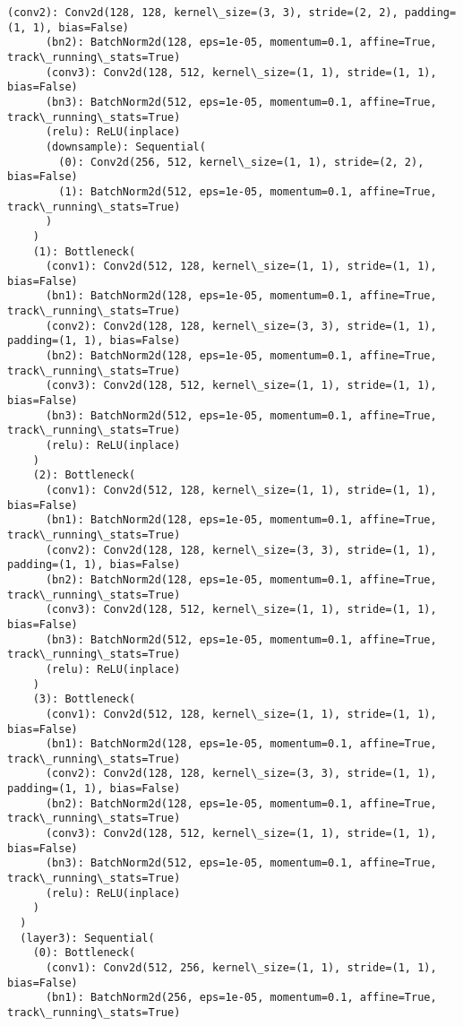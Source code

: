 \documentclass[11pt]{article}
\begin{document}
\begin{Verbatim}[commandchars=\\\{\}]
      (conv2): Conv2d(128, 128, kernel\_size=(3, 3), stride=(2, 2), padding=(1, 1), bias=False)
      (bn2): BatchNorm2d(128, eps=1e-05, momentum=0.1, affine=True, track\_running\_stats=True)
      (conv3): Conv2d(128, 512, kernel\_size=(1, 1), stride=(1, 1), bias=False)
      (bn3): BatchNorm2d(512, eps=1e-05, momentum=0.1, affine=True, track\_running\_stats=True)
      (relu): ReLU(inplace)
      (downsample): Sequential(
        (0): Conv2d(256, 512, kernel\_size=(1, 1), stride=(2, 2), bias=False)
        (1): BatchNorm2d(512, eps=1e-05, momentum=0.1, affine=True, track\_running\_stats=True)
      )
    )
    (1): Bottleneck(
      (conv1): Conv2d(512, 128, kernel\_size=(1, 1), stride=(1, 1), bias=False)
      (bn1): BatchNorm2d(128, eps=1e-05, momentum=0.1, affine=True, track\_running\_stats=True)
      (conv2): Conv2d(128, 128, kernel\_size=(3, 3), stride=(1, 1), padding=(1, 1), bias=False)
      (bn2): BatchNorm2d(128, eps=1e-05, momentum=0.1, affine=True, track\_running\_stats=True)
      (conv3): Conv2d(128, 512, kernel\_size=(1, 1), stride=(1, 1), bias=False)
      (bn3): BatchNorm2d(512, eps=1e-05, momentum=0.1, affine=True, track\_running\_stats=True)
      (relu): ReLU(inplace)
    )
    (2): Bottleneck(
      (conv1): Conv2d(512, 128, kernel\_size=(1, 1), stride=(1, 1), bias=False)
      (bn1): BatchNorm2d(128, eps=1e-05, momentum=0.1, affine=True, track\_running\_stats=True)
      (conv2): Conv2d(128, 128, kernel\_size=(3, 3), stride=(1, 1), padding=(1, 1), bias=False)
      (bn2): BatchNorm2d(128, eps=1e-05, momentum=0.1, affine=True, track\_running\_stats=True)
      (conv3): Conv2d(128, 512, kernel\_size=(1, 1), stride=(1, 1), bias=False)
      (bn3): BatchNorm2d(512, eps=1e-05, momentum=0.1, affine=True, track\_running\_stats=True)
      (relu): ReLU(inplace)
    )
    (3): Bottleneck(
      (conv1): Conv2d(512, 128, kernel\_size=(1, 1), stride=(1, 1), bias=False)
      (bn1): BatchNorm2d(128, eps=1e-05, momentum=0.1, affine=True, track\_running\_stats=True)
      (conv2): Conv2d(128, 128, kernel\_size=(3, 3), stride=(1, 1), padding=(1, 1), bias=False)
      (bn2): BatchNorm2d(128, eps=1e-05, momentum=0.1, affine=True, track\_running\_stats=True)
      (conv3): Conv2d(128, 512, kernel\_size=(1, 1), stride=(1, 1), bias=False)
      (bn3): BatchNorm2d(512, eps=1e-05, momentum=0.1, affine=True, track\_running\_stats=True)
      (relu): ReLU(inplace)
    )
  )
  (layer3): Sequential(
    (0): Bottleneck(
      (conv1): Conv2d(512, 256, kernel\_size=(1, 1), stride=(1, 1), bias=False)
      (bn1): BatchNorm2d(256, eps=1e-05, momentum=0.1, affine=True, track\_running\_stats=True)

\end{Verbatim}
\end{document}
